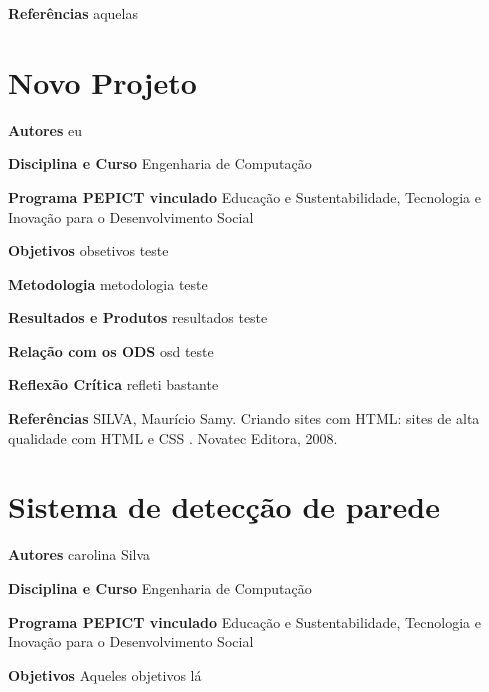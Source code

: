 \documentclass[12pt,openright,oneside,a4paper]{report}
\begin{document}
\vspace{0.7cm}
\noindent
\textbf{Referências}
aquelas

\vspace{0.7cm}
\newpage
\section{Novo Projeto}
\noindent
\textbf{Autores}
eu

\vspace{0.7cm}
\noindent
\textbf{Disciplina e Curso}
Engenharia de Computação

\vspace{0.7cm}
\noindent
\textbf{Programa PEPICT vinculado}
Educação e Sustentabilidade, Tecnologia e Inovação para o Desenvolvimento Social

\vspace{0.7cm}
\noindent
\textbf{Objetivos}
obsetivos teste

\vspace{0.7cm}
\noindent
\textbf{Metodologia}
metodologia teste

\vspace{0.7cm}
\noindent
\textbf{Resultados e Produtos}
resultados teste

\vspace{0.7cm}
\noindent
\textbf{Relação com os ODS}
osd teste

\vspace{0.7cm}
\noindent
\textbf{Reflexão Crítica}
refleti bastante

\vspace{0.7cm}
\noindent
\textbf{Referências}
SILVA, Maurício Samy. Criando sites com HTML: sites de alta qualidade com HTML e CSS . Novatec Editora, 2008.

\vspace{0.7cm}
\newpage
\section{Sistema de detecção de parede}
\noindent
\textbf{Autores}
carolina Silva

\vspace{0.7cm}
\noindent
\textbf{Disciplina e Curso}
Engenharia de Computação

\vspace{0.7cm}
\noindent
\textbf{Programa PEPICT vinculado}
Educação e Sustentabilidade, Tecnologia e Inovação para o Desenvolvimento Social

\vspace{0.7cm}
\noindent
\textbf{Objetivos}
Aqueles objetivos lá
\end{document}
